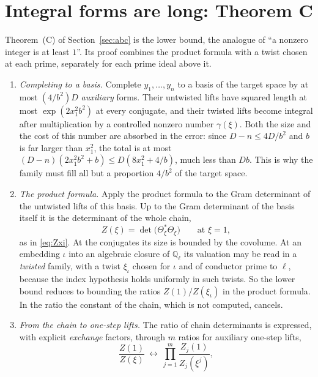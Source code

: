 \documentclass[11pt]{amsart}
\numberwithin{equation}{section}
\theoremstyle{definition}
\theoremstyle{remark}
\newcommand{\Q}{\mathbb Q}
\begin{document}
\section{Integral forms are long: Theorem C}\label{sec:thmC}

Theorem~(C) of Section~\ref{sec:abc} is the lower bound, the analogue of ``a nonzero integer is at least $1$''. Its proof combines the product formula with a twist chosen at each prime, separately for each prime ideal above it.

\begin{enumerate}[leftmargin=2em]
\item \emph{Completing to a basis.} Complete $y_1,\dots,y_n$ to a basis of the target space by at most $(4/b^2)D$ \emph{auxiliary} forms. Their untwisted lifts have squared length at most $\exp(2x_1^2b^2)$ at every conjugate, and their twisted lifts become integral after multiplication by a controlled nonzero number $\gamma(\xi)$. Both the size and the cost of this number are absorbed in the error: since $D-n\le4D/b^2$ and $b$ is far larger than $x_1^2$, the total is at most $(D-n)(2x_1^2b^2+b)\le D(8x_1^2+4/b)$, much less than $Db$. This is why the family must fill all but a proportion $4/b^2$ of the target space.
\item \emph{The product formula.} Apply the product formula to the Gram determinant of the untwisted lifts of this basis. Up to the Gram determinant of the basis itself it is the determinant of the whole chain,
\begin{equation}
 Z(\xi)=\det\bigl(\Theta_\xi^*\Theta_\xi\bigr)\qquad\text{at }\xi=1,
\end{equation}
as in \eqref{eq:Zxi}. At the conjugates its size is bounded by the covolume. At an embedding $\iota$ into an algebraic closure of $\Q_\ell$ its valuation may be read in a \emph{twisted} family, with a twist $\xi_\iota$ chosen for $\iota$ and of conductor prime to $\ell$, because the index hypothesis holds uniformly in such twists. So the lower bound reduces to bounding the ratios $Z(1)/Z(\xi_\iota)$ in the product formula. In the ratio the constant of the chain, which is not computed, cancels.
\item \emph{From the chain to one-step lifts.} The ratio of chain determinants is expressed, with explicit \emph{exchange} factors, through $m$ ratios for auxiliary one-step lifts,
\begin{equation}
 \frac{Z(1)}{Z(\xi)}\ \longleftrightarrow\ \prod_{j=1}^m\frac{Z_j(1)}{Z_j(\xi^j)},

\end{equation}
\end{enumerate}
\end{document}
